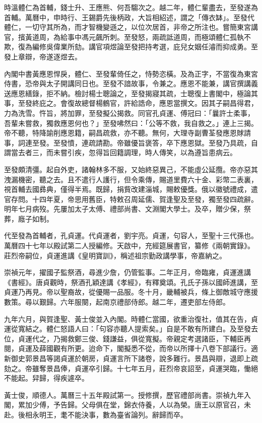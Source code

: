 \begin{pinyinscope}
時溫體仁為首輔，錢士升、王應熊、何吾騶次之。越二年，體仁輩盡去，至發遂為首輔。萬曆中，申時行、王錫爵先後柄政，大旨相紹述，謂之「傳衣缽」。至發代體仁，一切守其所為，而才智機變遜之，以位次居首，非帝之所注也。嘗簡東宮講官，擯黃道周，為給事中馮元飆所刺。至發怒，兩疏詆道周，而極頌體仁孤執不欺，復為編修吳偉業所劾。講官項煜論至發把持考選，庇兒女姻任濬而抑成勇。至發上章辯，帝遂逐煜去。

內閣中書黃應恩悍戾，體仁、至發輩倚任之，恃勢恣橫。及為正字，不當復為東宮侍書，恐帝與太子開講同日也。至發不諳故事，令兼之。應恩不能兼，講官撰講義送應恩繕錄，拒不納。檢討楊士聰論之，至發揭寢其疏，士聰復上書閣中，極論其事，至發終庇之。會復故總督楊鶴官，許給誥命，應恩當撰文。因其子嗣昌得君，力為洗雪。忤旨，將加罪，至發擬公揭救。同官孔貞運、傅冠曰：「曩許士柔事，吾輩未嘗救，獨救應恩何也？」至發咈然曰：「公等不救，我自救之。」連上三揭。帝不聽，特降諭削應恩籍，嗣昌疏救，亦不聽。無何，大理寺副曹荃發應恩賕請事，詞連至發。至發憤，連疏請勘。帝雖優旨褒答，卒下應恩獄。至發乃具疏，自謂當去者三，而未嘗引疾，忽得旨回籍調理，時人傳笑，以為遵旨患病云。

至發頗清彊。起自外吏，諸翰林多不服，又始終惡異己，不能虛公延攬。帝亦惡其洩漏機密，聽之去。且不遣行人護行，但令乘傳，賜道里費六十金、彩幣二表裏，視首輔去國彞典，僅得半焉。既歸，捐貲改建淄城，賜敕優獎。俄以徽號禮成，遣官存問。十四年夏，帝思用舊臣，特敕召周延儒、賀逢聖及至發，獨至發四疏辭。明年七月病歿。先屢加太子太傅、禮部尚書、文淵閣大學士。及卒，贈少保，祭葬，廕子如制。

代至發為首輔者，孔貞運。代貞運者，劉宇亮。貞運，句容人，至聖十三代孫也。萬曆四十七年以殿試第二人授編修。天啟中，充經筵展書官，纂修《兩朝實錄》。莊烈帝嗣位，貞運進講《皇明寶訓》，稱述祖宗勤政講學事，帝嘉納之。

崇禎元年，擢國子監祭酒，尋進少詹，仍管監事。二年正月，帝臨雍，貞運進講《書經》。唐貞觀時，祭酒孔穎達講《孝經》，有釋奠頌。孔氏子孫以國師進講，至貞運乃再見。帝以聖裔故，從優賜一品服。冬十月，畿輔被兵，條上御敵城守應援數策。尋以艱歸。六年服闋，起南京禮部侍郎。越二年，遷吏部左侍郎。

九年六月，與賀逢聖、黃士俊並入內閣。時體仁當國，欲重治復社，值其在告，貞運從寬結之。體仁怒語人曰：「句容亦聽人提索矣。」自是不敢有所建白。及至發去位，貞運代之，乃揭救鄭三俊、錢謙益，俱從寬擬。帝親定考選諸臣，下輔臣再閱，貞運及薛國觀有所更。迨命下，閣擬悉不從，而帝以所擇十八卷下部議行。適新御史郭景昌等謁貞運於朝房，貞運言所下諸卷，說多難行。景昌與辯，退即上疏劾之。帝雖奪景昌俸，貞運卒引歸。十七年五月，莊烈帝哀詔至，貞運哭臨，慟絕不能起。舁歸，得疾遽卒。

黃士俊，順德人。萬曆三十五年殿試第一。授修撰，歷官禮部尚書。崇禎九年入閣，累加少傅，予告歸。父母俱在堂，錦衣侍養，人以為榮。唐王以原官召，未赴。後相永明王，耄不能決事，數為臺省論列。辭歸而卒。


\end{pinyinscope}
